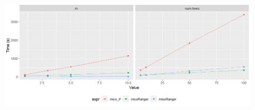 \documentclass[20pt,margin=1in,innermargin=-4.5in,blockverticalspace=-0.25in]{tikzposter}
\begin{document}
\begin{columns}
{        \begin{center}
            \vspace{-1.5em}
            \begin{tikzfigure}[]
                \includegraphics[scale=1.4]{plot_comptime_m_ntree_combined.png}
            \end{tikzfigure}
        \end{center}
        \vspace{-2em}
        
        \vspace{-1em}

        
    }


        \block{}{

}
\end{columns}
\end{document}
